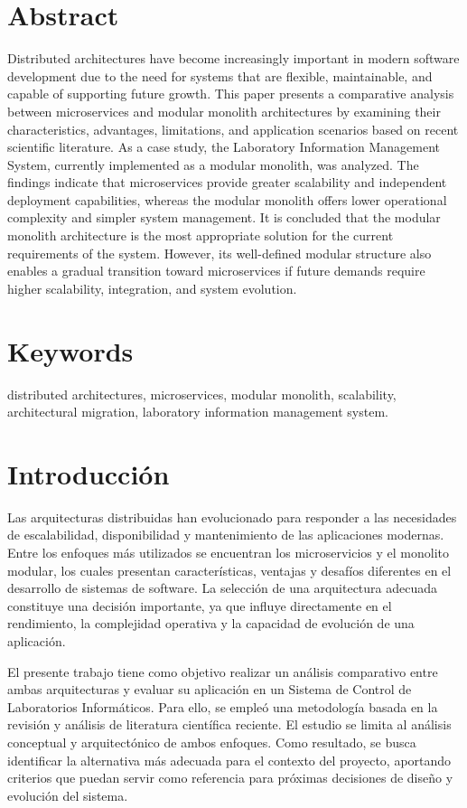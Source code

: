 \documentclass[10pt,conference]{IEEEtran}
\begin{document}
\section*{Abstract}
Distributed architectures have become increasingly important in modern software development due to the need for systems that are flexible, maintainable, and capable of supporting future growth. This paper presents a comparative analysis between microservices and modular monolith architectures by examining their characteristics, advantages, limitations, and application scenarios based on recent scientific literature. As a case study, the Laboratory Information Management System, currently implemented as a modular monolith, was analyzed. The findings indicate that microservices provide greater scalability and independent deployment capabilities, whereas the modular monolith offers lower operational complexity and simpler system management. It is concluded that the modular monolith architecture is the most appropriate solution for the current requirements of the system. However, its well-defined modular structure also enables a gradual transition toward microservices if future demands require higher scalability, integration, and system evolution.

\section*{Keywords}
distributed architectures, microservices, modular monolith, scalability, architectural migration, laboratory information management system.

\section{Introducción}
Las arquitecturas distribuidas han evolucionado para responder a las necesidades de escalabilidad, disponibilidad y mantenimiento de las aplicaciones modernas. Entre los enfoques más utilizados se encuentran los microservicios y el monolito modular, los cuales presentan características, ventajas y desafíos diferentes en el desarrollo de sistemas de software. La selección de una arquitectura adecuada constituye una decisión importante, ya que influye directamente en el rendimiento, la complejidad operativa y la capacidad de evolución de una aplicación.

El presente trabajo tiene como objetivo realizar un análisis comparativo entre ambas arquitecturas y evaluar su aplicación en un Sistema de Control de Laboratorios Informáticos. Para ello, se empleó una metodología basada en la revisión y análisis de literatura científica reciente. El estudio se limita al análisis conceptual y arquitectónico de ambos enfoques. Como resultado, se busca identificar la alternativa más adecuada para el contexto del proyecto, aportando criterios que puedan servir como referencia para próximas decisiones de diseño y evolución del sistema.
\end{document}
